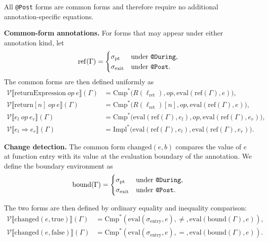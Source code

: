 \documentclass[pdflatex,sn-basic]{sn-jnl}%
\theoremstyle{thmstyleone}%
\theoremstyle{thmstyletwo}%
\theoremstyle{thmstylethree}%
\begin{document}
All \texttt{@Post} forms are common forms and therefore require no additional
annotation-specific equations.

\smallskip
\textbf{Common-form annotations.}
For forms that may appear under either annotation kind, let
\[
\mathrm{ref}(\Gamma)=
\begin{cases}
\sigma_{\text{pt}} & \text{under \texttt{@During}},\\
\sigma_{\text{exit}} & \text{under \texttt{@Post}}.
\end{cases}
\]
The common forms are then defined uniformly as
\begin{align*}
\mathcal{V}\llbracket
\text{returnExpression}\ \mathit{op}\ e
\rrbracket(\Gamma)
&=
\text{Cmp}^*\bigl(
R(\ell_{\text{ret}}),
\mathit{op},
\text{eval}(\mathrm{ref}(\Gamma),e)
\bigr), \\[3pt]
%
\mathcal{V}\llbracket
\text{return}[n]\ \mathit{op}\ e
\rrbracket(\Gamma)
&=
\text{Cmp}^*\bigl(
R(\ell_{\text{ret}})[n],
\mathit{op},
\text{eval}(\mathrm{ref}(\Gamma),e)
\bigr), \\[3pt]
%
\mathcal{V}\llbracket
e_l\ \mathit{op}\ e_r
\rrbracket(\Gamma)
&=
\text{Cmp}^*\bigl(
\text{eval}(\mathrm{ref}(\Gamma),e_l),
\mathit{op},
\text{eval}(\mathrm{ref}(\Gamma),e_r)
\bigr), \\[3pt]
%
\mathcal{V}\llbracket
e_l \Rightarrow e_r
\rrbracket(\Gamma)
&=
\text{Impl}^*\bigl(
\text{eval}(\mathrm{ref}(\Gamma),e_l),
\text{eval}(\mathrm{ref}(\Gamma),e_r)
\bigr).
\end{align*}

\smallskip
\noindent\textbf{Change detection.}
The common form $\mathrm{changed}(e,b)$ compares the value of $e$ at
function entry with its value at the evaluation boundary of the annotation.
We define the boundary environment as
\[
\mathrm{bound}(\Gamma)=
\begin{cases}
\sigma_{\mathrm{pt}} & \text{under \texttt{@During}},\\
\sigma_{\mathrm{exit}} & \text{under \texttt{@Post}}.
\end{cases}
\]

The two forms are then defined by ordinary equality and inequality comparison:
\begin{align*}
\mathcal{V}\llbracket
\mathrm{changed}(e,\mathrm{true})
\rrbracket(\Gamma)
&=
\mathrm{Cmp}^*\!\left(
    \mathrm{eval}(\sigma_{\mathrm{entry}},e),
    \neq,
    \mathrm{eval}(\mathrm{bound}(\Gamma),e)
\right), \\[3pt]
%
\mathcal{V}\llbracket
\mathrm{changed}(e,\mathrm{false})
\rrbracket(\Gamma)
&=
\mathrm{Cmp}^*\!\left(
    \mathrm{eval}(\sigma_{\mathrm{entry}},e),
    =,
    \mathrm{eval}(\mathrm{bound}(\Gamma),e)
\right).
\end{align*}
\end{document}
